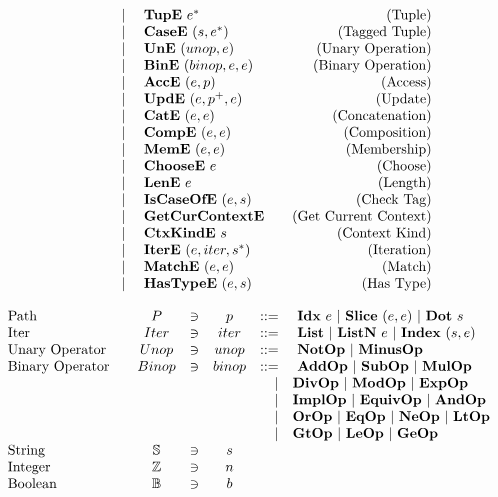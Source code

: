 {\begin{align*}
\begin{array}{lcccrlr}
    &&&& | & ~ \textbf{TupE} ~ e^* &\quad\text{(Tuple)} \\
    &&&& | & ~ \textbf{CaseE} ~ (s, e^*) &\quad\text{(Tagged Tuple)} \\
    &&&& | & ~ \textbf{UnE} ~ (unop, e) &\quad\text{(Unary Operation)} \\
    &&&& | & ~ \textbf{BinE} ~ (binop, e, e) &\quad\text{(Binary Operation)} \\
    &&&& | & ~ \textbf{AccE} ~ (e, p) &\quad\text{(Access)} \\
    &&&& | & ~ \textbf{UpdE} ~ (e, p^+, e) &\quad\text{(Update)} \\
    &&&& | & ~ \textbf{CatE} ~ (e, e) &\quad\text{(Concatenation)} \\
    &&&& | & ~ \textbf{CompE} ~ (e, e) &\quad\text{(Composition)} \\
    &&&& | & ~ \textbf{MemE} ~ (e, e) &\quad\text{(Membership)} \\
    &&&& | & ~ \textbf{ChooseE} ~ e &\quad\text{(Choose)} \\
    &&&& | & ~ \textbf{LenE} ~ e &\quad\text{(Length)} \\
    &&&& | & ~ \textbf{IsCaseOfE} ~ (e, s) &\quad\text{(Check Tag)} \\
    &&&& | & ~ \textbf{GetCurContextE}  &\quad\text{(Get Current Context)} \\
    &&&& | & ~ \textbf{CtxKindE} ~ s &\quad\text{(Context Kind)} \\
    &&&& | & ~ \textbf{IterE} ~ (e, iter, s^*) &\quad\text{(Iteration)} \\
    &&&& | & ~ \textbf{MatchE} ~ (e, e) &\quad\text{(Match)} \\
    &&&& | & ~ \textbf{HasTypeE} ~ (e, s) &\quad\text{(Has Type)} \\
\end{array}
\end{align*}
}

\newpage
\begin{align*}
\begin{array}{lcccrlr}
%
  \text{Path}\quad& P &\ni& p &::=& ~ \idxp ~ e ~ | ~ \slicep ~ (e, e) ~ | ~ \dotp ~ s \\
%
  \text{Iter}\quad& Iter &\ni& iter &::=& ~ \listiter ~ | ~ \listniter ~ e ~|~ \listidxiter ~ (s, e) \\
%
  \text{Unary Operator}\quad& Unop &\ni& unop &::=& ~ \notop ~ | ~ \minusop \\
  \text{Binary Operator}\quad& Binop &\ni& binop &::=& ~ \addop ~ | ~ \subop ~ | ~ \mulop \\
    &&&& | & \divop ~ | ~ \modop ~ | ~ \expop \\
    &&&& | & \implop ~ | ~ \equivop ~ | ~ \andop \\
    &&&& | & \orop ~ | ~ \eqop ~ | ~ \neop ~ | ~ \ltop \\
    &&&& | & \gtop ~ | ~ \leop ~ | ~ \geop \\
  \text{String}\quad& \mathbb S &\ni& s \\
  \text{Integer}\quad& \mathbb Z &\ni& n \\
  \text{Boolean}\quad& \mathbb B &\ni& b \\
\end{array}
\end{align*}

